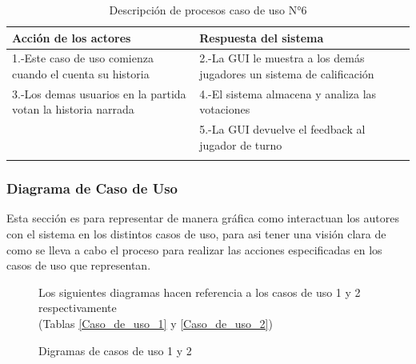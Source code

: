 \begin{longtable}[H]{| m{8cm} | m{8cm} |}
\hline 
\textbf{Acción de los actores} & \textbf{Respuesta del sistema}\\
\hline 
1.-Este caso de uso comienza cuando el cuenta su historia & 2.-La GUI le muestra a los demás jugadores un sistema de calificación\\
\hline
3.-Los demas usuarios en la partida votan la historia narrada & 4.-El sistema almacena y analiza las votaciones\\
\hline
& 5.-La GUI devuelve el feedback al jugador de turno\\
\hline
\caption{Descripción de procesos caso de uso N°6}
\end{longtable}
\newpage
\subsubsection{Diagrama de Caso de Uso}
Esta sección es para representar de manera gráfica como interactuan los autores con el sistema en los distintos casos de uso, para asi tener una visión clara de como se lleva a cabo el proceso para realizar las acciones especificadas en los casos de uso que representan.\\

\begin{figure}[H]
	\centering
	Los siguientes diagramas hacen referencia a los casos de uso 1 y 2 respectivamente\\(Tablas \ref{Caso_de_uso_1} y \ref{Caso_de_uso_2})
 	\caption{Digramas de casos de uso 1 y 2}
\end{figure}

